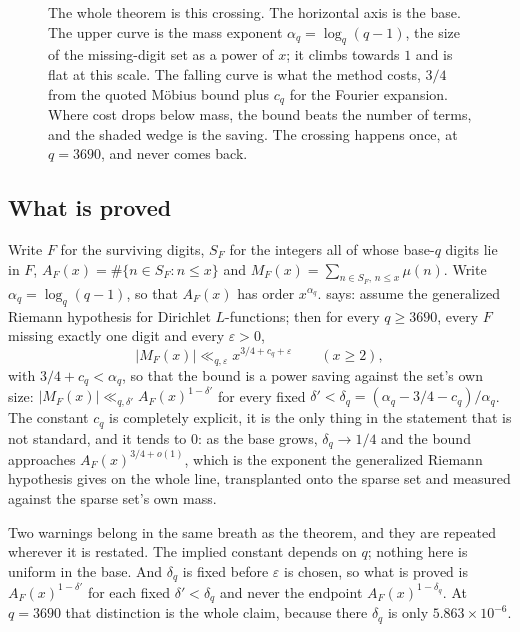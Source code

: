 \documentclass[11pt]{amsart}
\theoremstyle{definition}
\theoremstyle{remark}
\begin{document}
\begin{figure}[h]
\caption{The whole theorem is this crossing. The horizontal axis is the base. The upper curve is the mass exponent $\alpha_q = \log_q(q-1)$, the size of the missing-digit set as a power of $x$; it climbs towards $1$ and is flat at this scale. The falling curve is what the method costs, $3/4$ from the quoted M\"obius bound plus $c_q$ for the Fourier expansion. Where cost drops below mass, the bound beats the number of terms, and the shaded wedge is the saving. The crossing happens once, at $q = 3690$, and never comes back.}
\label{fig:crossing}
\end{figure}

\subsection*{What is proved}

Write $F$ for the surviving digits, $S_F$ for the integers all of whose base-$q$ digits lie in $F$, $A_F(x) = \#\{n \in S_F : n \le x\}$ and $M_F(x) = \sum_{n \in S_F,\, n \le x} \mu(n)$. Write $\alpha_q = \log_q(q-1)$, so that $A_F(x)$ has order $x^{\alpha_q}$.  says: assume the generalized Riemann hypothesis for Dirichlet $L$-functions; then for every $q \ge 3690$, every $F$ missing exactly one digit and every $\varepsilon > 0$,
\[
  |M_F(x)| \ll_{q,\varepsilon} x^{3/4 + c_q + \varepsilon} \qquad (x \ge 2),
\]
with $3/4 + c_q < \alpha_q$, so that the bound is a power saving against the set's own size: $|M_F(x)| \ll_{q,\delta'} A_F(x)^{1 - \delta'}$ for every fixed $\delta' < \delta_q = (\alpha_q - 3/4 - c_q)/\alpha_q$. The constant $c_q$ is completely explicit, it is the only thing in the statement that is not standard, and it tends to $0$: as the base grows, $\delta_q \to 1/4$ and the bound approaches $A_F(x)^{3/4 + o(1)}$, which is the exponent the generalized Riemann hypothesis gives on the whole line, transplanted onto the sparse set and measured against the sparse set's own mass.

Two warnings belong in the same breath as the theorem, and they are repeated wherever it is restated. The implied constant depends on $q$; nothing here is uniform in the base. And $\delta_q$ is fixed before $\varepsilon$ is chosen, so what is proved is $A_F(x)^{1-\delta'}$ for each fixed $\delta' < \delta_q$ and never the endpoint $A_F(x)^{1 - \delta_q}$. At $q = 3690$ that distinction is the whole claim, because there $\delta_q$ is only $5.863 \times 10^{-6}$.
\end{document}
